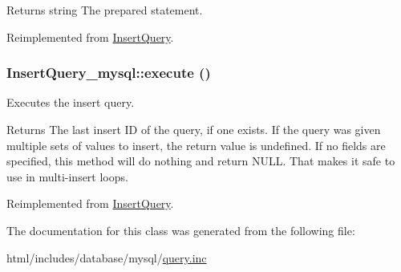 \begin{DoxyReturn}{Returns}
string The prepared statement. 
\end{DoxyReturn}


Reimplemented from \hyperlink{classInsertQuery_a996fb0719632b8861284683c1ff711fa}{InsertQuery}.\hypertarget{classInsertQuery__mysql_a52483727457029115fc127c562b47502}{
\subsubsection[{execute}]{\setlength{\rightskip}{0pt plus 5cm}InsertQuery\_\-mysql::execute ()}}
\label{classInsertQuery__mysql_a52483727457029115fc127c562b47502}
Executes the insert query.

\begin{DoxyReturn}{Returns}
The last insert ID of the query, if one exists. If the query was given multiple sets of values to insert, the return value is undefined. If no fields are specified, this method will do nothing and return NULL. That makes it safe to use in multi-\/insert loops. 
\end{DoxyReturn}


Reimplemented from \hyperlink{classInsertQuery_a9bcd2f989e2ae0173bd6f58b6ede12fc}{InsertQuery}.

The documentation for this class was generated from the following file:\begin{DoxyCompactItemize}
\item 
html/includes/database/mysql/\hyperlink{mysql_2query_8inc}{query.inc}\end{DoxyCompactItemize}
